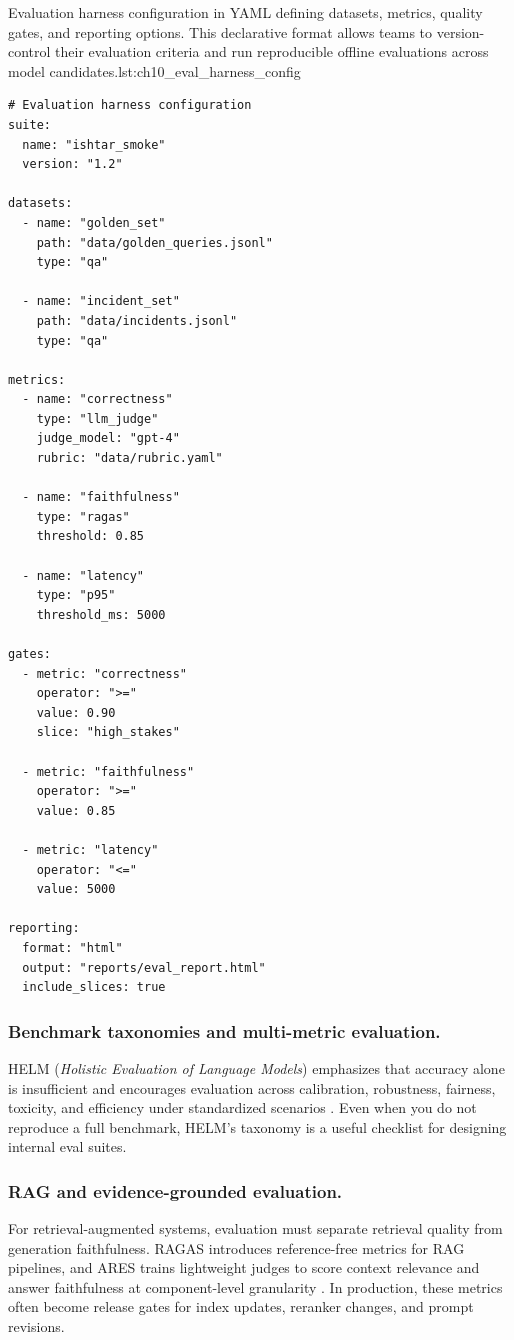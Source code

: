 \begin{codebox}{Evaluation harness configuration in YAML defining datasets, metrics, quality gates, and reporting options. This declarative format allows teams to version-control their evaluation criteria and run reproducible offline evaluations across model candidates.}{lst:ch10_eval_harness_config}
\begin{verbatim}
# Evaluation harness configuration
suite:
  name: "ishtar_smoke"
  version: "1.2"

datasets:
  - name: "golden_set"
    path: "data/golden_queries.jsonl"
    type: "qa"

  - name: "incident_set"
    path: "data/incidents.jsonl"
    type: "qa"

metrics:
  - name: "correctness"
    type: "llm_judge"
    judge_model: "gpt-4"
    rubric: "data/rubric.yaml"

  - name: "faithfulness"
    type: "ragas"
    threshold: 0.85

  - name: "latency"
    type: "p95"
    threshold_ms: 5000

gates:
  - metric: "correctness"
    operator: ">="
    value: 0.90
    slice: "high_stakes"

  - metric: "faithfulness"
    operator: ">="
    value: 0.85

  - metric: "latency"
    operator: "<="
    value: 5000

reporting:
  format: "html"
  output: "reports/eval_report.html"
  include_slices: true
\end{verbatim}
\end{codebox}

\subsubsection{Benchmark taxonomies and multi-metric evaluation.}
HELM (\emph{Holistic Evaluation of Language Models}) emphasizes that accuracy alone is insufficient and encourages evaluation across
calibration, robustness, fairness, toxicity, and efficiency under standardized scenarios \cite{helm_arxiv,helm_site}.
Even when you do not reproduce a full benchmark, HELM’s taxonomy is a useful checklist for designing internal eval suites.

\subsubsection{RAG and evidence-grounded evaluation.}
For retrieval-augmented systems, evaluation must separate retrieval quality from generation faithfulness.
RAGAS introduces reference-free metrics for RAG pipelines, and ARES trains lightweight judges to score context relevance and answer faithfulness
at component-level granularity \cite{ragas_arxiv,ragas_eacl2024,ares_naacl2024}.
In production, these metrics often become release gates for index updates, reranker changes, and prompt revisions.

